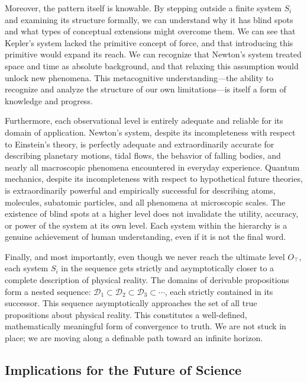 \documentclass[11pt]{article}
\begin{document}
Moreover, the pattern itself is knowable. By stepping outside a finite system $S_i$ and examining its structure formally, we can understand why it has blind spots and what types of conceptual extensions might overcome them. We can see that Kepler's system lacked the primitive concept of force, and that introducing this primitive would expand its reach. We can recognize that Newton's system treated space and time as absolute background, and that relaxing this assumption would unlock new phenomena. This metacognitive understanding—the ability to recognize and analyze the structure of our own limitations—is itself a form of knowledge and progress.

Furthermore, each observational level is entirely adequate and reliable for its domain of application. Newton's system, despite its incompleteness with respect to Einstein's theory, is perfectly adequate and extraordinarily accurate for describing planetary motions, tidal flows, the behavior of falling bodies, and nearly all macroscopic phenomena encountered in everyday experience. Quantum mechanics, despite its incompleteness with respect to hypothetical future theories, is extraordinarily powerful and empirically successful for describing atoms, molecules, subatomic particles, and all phenomena at microscopic scales. The existence of blind spots at a higher level does not invalidate the utility, accuracy, or power of the system at its own level. Each system within the hierarchy is a genuine achievement of human understanding, even if it is not the final word.

Finally, and most importantly, even though we never reach the ultimate level $O_\top$, each system $S_i$ in the sequence gets strictly and asymptotically closer to a complete description of physical reality. The domains of derivable propositions form a nested sequence: $\mathcal{D}_1 \subset \mathcal{D}_2 \subset \mathcal{D}_3 \subset \cdots$, each strictly contained in its successor. This sequence asymptotically approaches the set of all true propositions about physical reality. This constitutes a well-defined, mathematically meaningful form of convergence to truth. We are not stuck in place; we are moving along a definable path toward an infinite horizon.


\subsection{Implications for the Future of Science}
\label{subsec:future_science}
\end{document}
